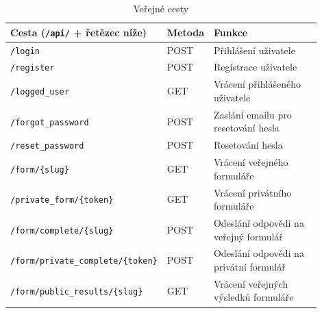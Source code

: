 	\newpage
	\begin{table}[H]
		\centering
		\begin{tabular}{ | p{0.4\linewidth} | p{0.1\linewidth} | p{0.4\linewidth} | } 
			\hline
			\textbf{Cesta (\texttt{/api/} + řetězec níže)} & \textbf{Metoda} & \textbf{Funkce} \\ 
			\hline
			\texttt{/login} & POST & Přihlášení uživatele \\ 
			\hline
			\texttt{/register} & POST & Registrace uživatele \\ 
			\hline
			\texttt{/logged\_user} & GET & Vrácení přihlášeného uživatele \\ 
			\hline
			\texttt{/forgot\_password} & POST & Zaslání emailu pro resetování hesla \\
			\hline
			\texttt{/reset\_password} & POST & Resetování hesla \\
			\hline
			\texttt{/form/\{slug\}} & GET & Vrácení veřejného formuláře \\
			\hline
			\texttt{/private\_form/\{token\}} & GET & Vrácení privátního formuláře \\
			\hline
			\texttt{/form/complete/\{slug\}} & POST & Odeslání odpovědi na veřejný formulář \\
			\hline
			\texttt{/form/private\_complete/\{token\}} & POST & Odeslání odpovědi na privátní formulář \\
			\hline
			\texttt{/form/public\_results/\{slug\}} & GET & Vrácení veřejných výsledků formuláře \\
			\hline
		\end{tabular}
		\caption{Veřejné cesty}
		\label{tab:verejne_cesty}
	\end{table}


